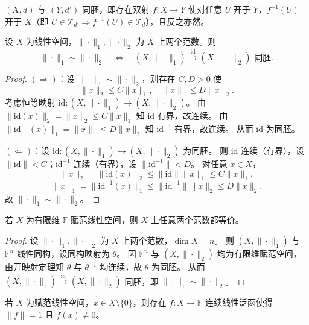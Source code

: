 \documentclass[lang=cn,a4paper,newtx,section]{elegantbook}
\begin{document}
\begin{remark}
  $(X,d)$ 与 $(Y,d')$ 同胚，即存在双射 $f:X\to Y$ 使对任意 $U$ 开于 $Y$，$f^{-1}(U)$ 开于 $X$（即 $U\in\mathcal{T}_{d'}\Rightarrow f^{-1}(U)\in\mathcal{T}_d$），且反之亦然。
\end{remark}

\begin{proposition}
  设 $X$ 为线性空间，$\|\cdot\|_1,\|\cdot\|_2$ 为 $X$ 上两个范数。则
  \[
    \|\cdot\|_1\sim\|\cdot\|_2\quad\Longleftrightarrow\quad(X,\|\cdot\|_1)\xrightarrow{\mathrm{id}}(X,\|\cdot\|_2)\text{ 同胚}.
  \]
\end{proposition}

\begin{proof}
  $(\Rightarrow)$：设 $\|\cdot\|_1\sim\|\cdot\|_2$，则存在 $C,D>0$ 使
  \[
    \|x\|_2\le C\|x\|_1,\quad\|x\|_1\le D\|x\|_2.
  \]
  考虑恒等映射 $\mathrm{id}:(X,\|\cdot\|_1)\to(X,\|\cdot\|_2)$。
  由 $\|\mathrm{id}(x)\|_2=\|x\|_2\le C\|x\|_1$ 知 $\mathrm{id}$ 有界，故连续。
  由 $\|\mathrm{id}^{-1}(x)\|_1=\|x\|_1\le D\|x\|_2$ 知 $\mathrm{id}^{-1}$ 有界，故连续。
  从而 $\mathrm{id}$ 为同胚。

  $(\Leftarrow)$：设 $\mathrm{id}:(X,\|\cdot\|_1)\to(X,\|\cdot\|_2)$ 为同胚。
  则 $\mathrm{id}$ 连续（有界），设 $\|\mathrm{id}\|<C$；$\mathrm{id}^{-1}$ 连续（有界），设 $\|\mathrm{id}^{-1}\|<D$。
  对任意 $x\in X$，
  \[
    \|x\|_2=\|\mathrm{id}(x)\|_2\le\|\mathrm{id}\|\|x\|_1\le C\|x\|_1,
  \]
  \[
    \|x\|_1=\|\mathrm{id}^{-1}(x)\|_1\le\|\mathrm{id}^{-1}\|\|x\|_2\le D\|x\|_2.
  \]
  故 $\|\cdot\|_1\sim\|\cdot\|_2$。
\end{proof}

\begin{theorem}
  若 $X$ 为有限维 $\mathbb{F}$ 赋范线性空间，则 $X$ 上任意两个范数都等价。
\end{theorem}

\begin{proof}
  设 $\|\cdot\|_1,\|\cdot\|_2$ 为 $X$ 上两个范数，$\dim X=n$。
  则 $(X,\|\cdot\|_1)$ 与 $\mathbb{F}^n$ 线性同构，设同构映射为 $\theta$。
  因 $\mathbb{F}^n$ 与 $(X,\|\cdot\|_2)$ 均为有限维赋范空间，由开映射定理知 $\theta$ 与 $\theta^{-1}$ 均连续，故 $\theta$ 为同胚。
  从而 $(X,\|\cdot\|_1)\xrightarrow{\mathrm{id}}(X,\|\cdot\|_2)$ 同胚，即 $\|\cdot\|_1\sim\|\cdot\|_2$。
\end{proof}

\begin{theorem}\label{thm:nonzero-functional}
  若 $X$ 为赋范线性空间，$x\in X\setminus\{0\}$，则存在 $f:X\to\mathbb{F}$ 连续线性泛函使得 $\|f\|=1$ 且 $f(x)\ne 0$。
\end{theorem}
\end{document}
